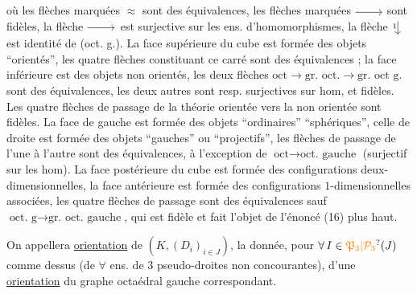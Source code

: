 %
où les flèches marquées $\approx$ sont des équivalences,
les flèches marquées $\mathrel{\tikz[baseline=-.45ex]{\draw[->] (0,0)--(.84,0); \draw[dotted] (.08,.02) to[bend left=100] (.12,.15);}}$ sont fidèles, la
flèche $\mathrel{\tikz[baseline=-.45ex]{\draw[->] (0,0)--(.84,0); \draw[dotted] (.81,.02) to[bend right=105] (.66,.17);}}$ est surjective sur les ens. d'homomorphismes,
la flèche  $\mathrel{\tikz[baseline=-.45ex]{\draw[->] (0,.21)--(0,-.21); \node[left,inner sep=.7pt] at (0,.06) {\scriptsize 1};}}$ est 
identité de (oct. g.). La face supérieure du
cube est formée des objets ``orientés'', les quatre
flèches constituant ce carré sont des équivalences ;
la face inférieure est  des objets
non orientés,  les deux flèches
$\textrm{oct}\longrightarrow\textrm{gr. oct.}\longrightarrow\textrm{gr. oct g.}$ sont des équivalences,
les deux autres sont resp. surjectives sur  hom,
et fidèles. Les quatre flèches de passage
de la théorie orientée vers la non orientée sont
fidèles. La face de gauche est formée des
objets ``ordinaires''  ``sphériques'', celle de
droite est formée des objets ``gauches'' ou
``projectifs'', les  flèches de passage de l'une
à l'autre sont des équivalences, à l'exception
de $\textrm{oct}\longrightarrow\textrm{oct. gauche}$ (surjectif sur les
hom). La face postérieure du cube est
formée des configurations deux-dimensionnelles,
 la face antérieure est formée des
configurations $1$-dimensionnelles associées, les
quatre flèches de passage sont des équivalences
sauf $\textrm{oct. g}\longrightarrow\textrm{gr. oct. gauche}$, qui est fidèle
et fait l'objet de l'énoncé (16) plus haut.

On appellera \uline{orientation} de $(K,(D_i)_{i\in J})$, la
donnée, pour $\forall\, I\in\unsure{\mathfrak P_3|\mathcal P_3}(J)$ comme dessus
(de $\forall$ ens. de 3 pseudo-droites non concourantes),
d'une \uline{orientation}  du graphe
octaédral gauche correspondant.

